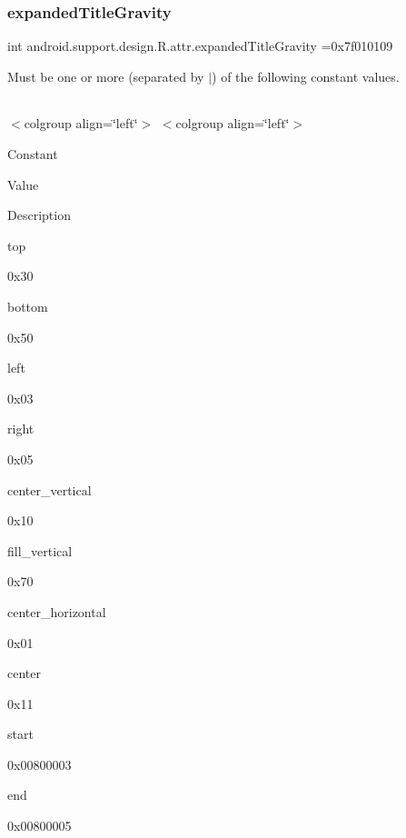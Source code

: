 \subsubsection{\texorpdfstring{expanded\+Title\+Gravity}{expandedTitleGravity}}
{\footnotesize\ttfamily int android.\+support.\+design.\+R.\+attr.\+expanded\+Title\+Gravity =0x7f010109\hspace{0.3cm}{\ttfamily [static]}}

Must be one or more (separated by \textquotesingle{}$\vert$\textquotesingle{}) of the following constant values.

\tabulinesep=1mm
\begin{longtabu} spread 0pt [c]{*{0}{|X[-1]}|}
\hline
\end{longtabu}
$<$colgroup align=\char`\"{}left\char`\"{}$>$ $<$colgroup align=\char`\"{}left\char`\"{}$>$ 

Constant

Value

Description 

{\ttfamily top}

0x30

{\ttfamily bottom}

0x50

{\ttfamily left}

0x03

{\ttfamily right}

0x05

{\ttfamily center\+\_\+vertical}

0x10

{\ttfamily fill\+\_\+vertical}

0x70

{\ttfamily center\+\_\+horizontal}

0x01

{\ttfamily center}

0x11

{\ttfamily start}

0x00800003

{\ttfamily end}

0x00800005\mbox{\label{classandroid_1_1support_1_1design_1_1R_1_1attr_a0fccc0bfb61b2986719bdae726085c6c}} 
